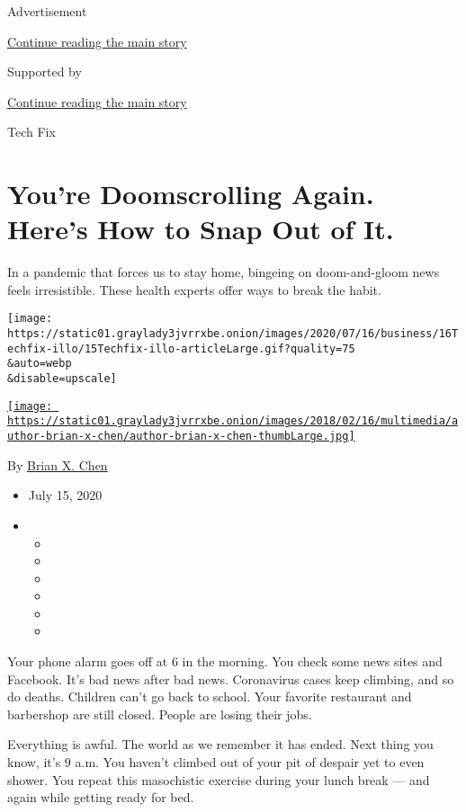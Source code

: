 Advertisement

\protect\hyperlink{after-top}{Continue reading the main story}

Supported by

\protect\hyperlink{after-sponsor}{Continue reading the main story}

Tech Fix

\hypertarget{youre-doomscrolling-again-heres-how-to-snap-out-of-it}{%
\section{You're Doomscrolling Again. Here's How to Snap Out of
It.}\label{youre-doomscrolling-again-heres-how-to-snap-out-of-it}}

In a pandemic that forces us to stay home, bingeing on doom-and-gloom
news feels irresistible. These health experts offer ways to break the
habit.

\texttt{[image: https://static01.graylady3jvrrxbe.onion/images/2020/07/16/business/16Techfix-illo/15Techfix-illo-articleLarge.gif?quality=75\\\&auto=webp\\\&disable=upscale]}

\href{https://www.nytimes3xbfgragh.onion/by/brian-x-chen}{\texttt{[image: https://static01.graylady3jvrrxbe.onion/images/2018/02/16/multimedia/author-brian-x-chen/author-brian-x-chen-thumbLarge.jpg]}}

By \href{https://www.nytimes3xbfgragh.onion/by/brian-x-chen}{Brian X.
Chen}

\begin{itemize}
\item
  July 15, 2020
\item
  \begin{itemize}
  \item
  \item
  \item
  \item
  \item
  \item
  \end{itemize}
\end{itemize}

Your phone alarm goes off at 6 in the morning. You check some news sites
and Facebook. It's bad news after bad news. Coronavirus cases keep
climbing, and so do deaths. Children can't go back to school. Your
favorite restaurant and barbershop are still closed. People are losing
their jobs.

Everything is awful. The world as we remember it has ended. Next thing
you know, it's 9 a.m. You haven't climbed out of your pit of despair yet
to even shower. You repeat this masochistic exercise during your lunch
break --- and again while getting ready for bed.

